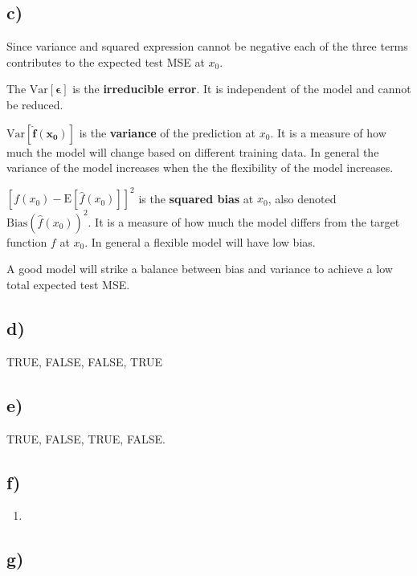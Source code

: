 \documentclass[
]{article}
\begin{document}
\hypertarget{c}{%
\subsection{c)}\label{c}}

Since variance and squared expression cannot be negative each of the
three terms contributes to the expected test MSE at \(x_0\).

The \(\pmb{\mathrm{Var}[ \epsilon ]}\) is the \textbf{irreducible
error}. It is independent of the model and cannot be reduced.

\(\pmb{\mathrm{Var}[ \hat{f}( x_{0})]}\) is the \textbf{variance} of the
prediction at \(x_{0}\). It is a measure of how much the model will
change based on different training data. In general the variance of the
model increases when the the flexibility of the model increases.

\([ f( x_{0}) - \mathrm{E}[\hat{f}( x_{0})]]^{2}\) is the
\textbf{squared bias} at \(x_{0}\), also denoted
\(\mathrm{Bias}(\hat{f}( x_{0}))^{2}\). It is a measure of how much the
model differs from the target function \(f\) at \(x_{0}\). In general a
flexible model will have low bias.

A good model will strike a balance between bias and variance to achieve
a low total expected test MSE.

\hypertarget{d}{%
\subsection{d)}\label{d}}

TRUE, FALSE, FALSE, TRUE

\hypertarget{e}{%
\subsection{e)}\label{e}}

TRUE, FALSE, TRUE, FALSE.

\hypertarget{f}{%
\subsection{f)}\label{f}}

\begin{enumerate}
\def\labelenumi{(\roman{enumi})}
\setcounter{enumi}{1}
\item
\end{enumerate}

\hypertarget{g}{%
\subsection{g)}\label{g}}
\end{document}
